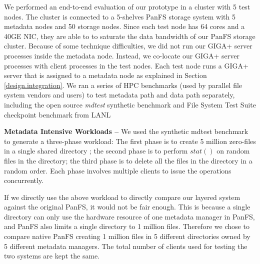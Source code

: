 We performed an end-to-end evaluation of our prototype in a cluster with 5 test nodes.
The cluster is connected to a 5-shelves PanFS storage system
with 5 metadata nodes and 50 storage nodes.
Since each test node has 64 cores and a 40GE NIC, they are able to
to saturate the data bandwidth of our PanFS storage cluster.
Because of some technique difficulties,
we did not run our GIGA+ server processes inside the metadata node.
Instead, we co-locate our GIGA+ server processes
with client processes in the test nodes.
Each test node runs a GIGA+ server that is assigned to a metadata node
as explained in Section \ref{design.integration}.
We ran a series of HPC benchmarks (used by parallel file system vendors and users)
to test metadata path and data path separately,
including the open source \textit{mdtest} synthetic benchmark \cite{mdtest}
and File System Test Suite checkpoint benchmark from LANL \cite{mpiio}

\textbf{Metadata Intensive Workloads -- }
We used the synthetic mdtest benchmark \cite{mdtest}
to generate a three-phase workload:
The first phase is to create 5 million
zero-files in a single shared directory \cite{ceph:weil06, GIGA11};
the second phase is to perform $stat()$ on random files in the directory;
the third phase is to delete all the files in the directory in a random order.
Each phase involves multiple clients to issue the operations concurrently.

If we directly use the above workload to directly compare our layered system
against the original PanFS, it would not be fair enough.
This is because a single directory can only use the hardware resource
of one metadata manager in PanFS,
and PanFS also limits a single directory to 1 million files.
Therefore we chose to compare native PanFS creating 1 million files
in 5 different directories owned by 5 different metadata managers.
The total number of clients used for testing the two systems
are kept the same.

